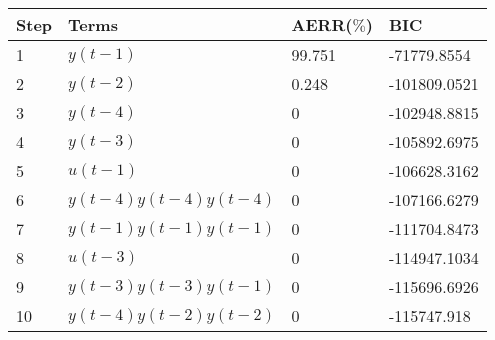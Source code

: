 \begin{tabular}{llll}
Step & Terms & AERR($\%$) & BIC \\ 
\hline 
1 & $y(t-1)$ & 99.751 & -71779.8554 \\ 
2 & $y(t-2)$ & 0.248 & -101809.0521 \\ 
3 & $y(t-4)$ & 0 & -102948.8815 \\ 
4 & $y(t-3)$ & 0 & -105892.6975 \\ 
5 & $u(t-1)$ & 0 & -106628.3162 \\ 
6 & $y(t-4)y(t-4)y(t-4)$ & 0 & -107166.6279 \\ 
7 & $y(t-1)y(t-1)y(t-1)$ & 0 & -111704.8473 \\ 
8 & $u(t-3)$ & 0 & -114947.1034 \\ 
9 & $y(t-3)y(t-3)y(t-1)$ & 0 & -115696.6926 \\ 
10 & $y(t-4)y(t-2)y(t-2)$ & 0 & -115747.918 \\ 
\hline 
\end{tabular}